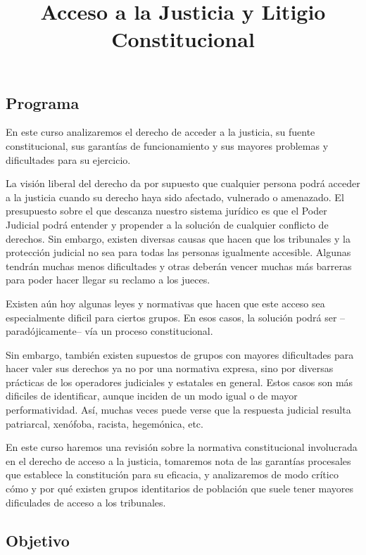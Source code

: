 \documentclass[
]{article}
\title{Acceso a la Justicia y Litigio Constitucional}
\author{}
\date{\vspace{-2.5em}}
\begin{document}
\maketitle

\hypertarget{programa}{%
\subsection{Programa}\label{programa}}

En este curso analizaremos el derecho de acceder a la justicia, su
fuente constitucional, sus garantías de funcionamiento y sus mayores
problemas y dificultades para su ejercicio.

La visión liberal del derecho da por supuesto que cualquier persona
podrá acceder a la justicia cuando su derecho haya sido afectado,
vulnerado o amenazado. El presupuesto sobre el que descanza nuestro
sistema jurídico es que el Poder Judicial podrá entender y propender a
la solución de cualquier conflicto de derechos. Sin embargo, existen
diversas causas que hacen que los tribunales y la protección judicial no
sea para todas las personas igualmente accesible. Algunas tendrán muchas
menos dificultades y otras deberán vencer muchas más barreras para poder
hacer llegar su reclamo a los jueces.

Existen aún hoy algunas leyes y normativas que hacen que este acceso sea
especialmente dificil para ciertos grupos. En esos casos, la solución
podrá ser --paradójicamente-- vía un proceso constitucional.

Sin embargo, también existen supuestos de grupos con mayores
dificultades para hacer valer sus derechos ya no por una normativa
expresa, sino por diversas prácticas de los operadores judiciales y
estatales en general. Estos casos son más dificiles de identificar,
aunque inciden de un modo igual o de mayor performatividad. Así, muchas
veces puede verse que la respuesta judicial resulta patriarcal,
xenófoba, racista, hegemónica, etc.

En este curso haremos una revisión sobre la normativa constitucional
involucrada en el derecho de acceso a la justicia, tomaremos nota de las
garantías procesales que establece la constitución para su eficacia, y
analizaremos de modo crítico cómo y por qué existen grupos identitarios
de población que suele tener mayores dificulades de acceso a los
tribunales.

\hypertarget{objetivo}{%
\subsection{Objetivo}\label{objetivo}}
\end{document}
